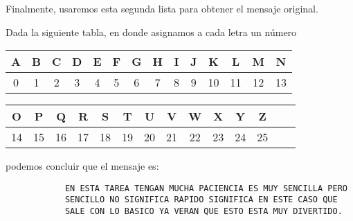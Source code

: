 \documentclass[letterpaper,11pt]{article}
\begin{document}
\begin{enumerate}
\begin{enumerate}
\begin{itemize}
            Finalmente, usaremos esta segunda lista para obtener el mensaje 
            original.
            
            Dada la siguiente tabla, en donde asignamos a cada letra
            un número 
            \begin{center}
            \begin{tabular}{|c|c|c|c|c|c|c|c|c|c|c|c|c|c|}
            \hline
            A & B & C & D & E & F & G & H & I & J & K  & L  & M  & N 
            \\ \hline
            0 & 1 & 2 & 3 & 4 & 5 & 6 & 7 & 8 & 9 & 10 & 11 & 12 & 13
            \\ \hline
            \end{tabular}
            \end{center}
            \begin{center}
            \begin{tabular}{|c|c|c|c|c|c|c|c|c|c|c|c|c|c|}
            \hline
            O  & P  & Q  & R  & S  & T  & U  & V  & W  & X  & Y  & Z  
            \\ \hline
            14 & 15 & 16 & 17 & 18 & 19 & 20 & 21 & 22 & 23 & 24 & 25
            \\ \hline
            \end{tabular}
            \end{center}
            
            podemos concluir que el mensaje es:
            \begin{verbatim}
            EN ESTA TAREA TENGAN MUCHA PACIENCIA ES MUY SENCILLA PERO 
            SENCILLO NO SIGNIFICA RAPIDO SIGNIFICA EN ESTE CASO QUE 
            SALE CON LO BASICO YA VERAN QUE ESTO ESTA MUY DIVERTIDO.
            \end{verbatim}
    \end{itemize}
    \end{enumerate}
\end{enumerate}
\end{document}
